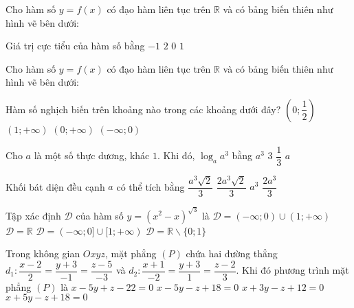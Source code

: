 \begin{ex}%
Cho hàm số $y=f(x)$ có đạo hàm liên tục trên $\mathbb{R}$ và có bảng biến thiên như hình vẽ bên dưới: 
\begin{center}
\end{center}
Giá trị cực tiểu của hàm số bằng
\choice
{\True $-1$}
{$2$}
{$0$}
{$1$}

\end{ex}
\begin{ex}%
Cho hàm số $y=f(x)$ có đạo hàm liên tục trên $\mathbb{R}$ và có bảng biến thiên như hình vẽ bên dưới:
\begin{center}
\end{center}
Hàm số nghịch biến trên khoảng nào trong các khoảng dưới đây?
\choice
{\True $\left(0; \dfrac{1}{2}\right)$}
{$(1;+\infty)$}
{$(0;+\infty)$}
{$(-\infty; 0)$}

\end{ex}
\begin{ex}%
Cho $a$ là một số thực dương, khác $1$. Khi đó, $\log_a a^3$ bằng
\choice
{$a^3$}
{\True $3$}
{$\dfrac{1}{3}$}
{$a$}

\end{ex}
\begin{ex}%
Khối bát diện đều cạnh $a$ có thể tích bằng
\choice
{\True $\dfrac{a^3 \sqrt{2}}{3}$}
{$\dfrac{2 a^3 \sqrt{2}}{3}$}
{$a^3$}
{$\dfrac{2 a^3}{3}$}

\end{ex}
\begin{ex}%
Tập xác định $\mathscr{D}$ của hàm số $y=\left(x^2-x\right)^{\sqrt{3}}$ là
\choice
{\True $\mathscr{D}=(-\infty; 0) \cup(1;+\infty)$}
{$\mathscr{D}=\mathbb{R}$}
{$\mathscr{D}=(-\infty; 0] \cup[1;+\infty)$}
{$\mathscr{D}=\mathbb{R} \backslash\{0; 1\}$}

\end{ex}
\begin{ex}%
Trong không gian $O x y z$, mặt phẳng $(P)$ chứa hai đường thẳng $d_1\colon \dfrac{x-2}{2}=\dfrac{y+3}{-1}=\dfrac{z-5}{-3}$ và $d_2\colon \dfrac{x+1}{-2}=\dfrac{y+3}{1}=\dfrac{z-2}{3}$. Khi đó phương trình mặt phẳng $(P)$ là
\choice
{$x-5 y+z-22=0$}
{$x-5 y-z+18=0$}
{$x+3 y-z+12=0$}
{\True $x+5 y-z+18=0$}

\end{ex}
